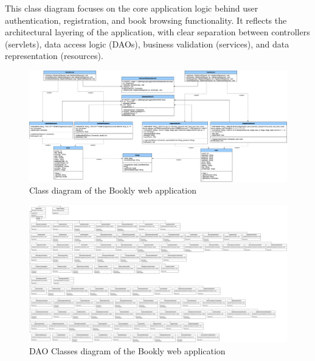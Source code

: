 This class diagram focuses on the core application logic behind user authentication, registration, and book browsing functionality. It reflects the architectural layering of the application, with clear separation between controllers (servlets), data access logic (DAOs), business validation (services), and data representation (resources).
\medskip

\begin{figure}[h]
    \centering
    \includegraphics[width=\textwidth]{HW1Report/photos/ClassDiagram.png}
    \caption{Class diagram of the Bookly web application}
    \label{fig:classdiagram}
\end{figure}

\begin{figure}[h]
    \centering
    \includegraphics[width=\textwidth]{HW1Report/photos/dao-class-diagram.png}
    \caption{DAO Classes diagram of the Bookly web application}
    \label{fig:daoclassdiagram}
\end{figure}